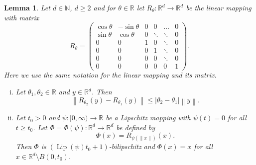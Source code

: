 \documentclass[a4paper, bibliography=totoc]{scrartcl}
\newtheorem{lemma}[define]{Lemma}
\numberwithin{claimcounter}{define}
\newcommand{\R}{\mathbb{R}}
\newcommand{\N}{\mathbb{N}}
\newcommand{\lip}{\operatorname{Lip}}
\newcommand{\abs}[1]{\left|#1\right|}
\newcommand{\enorm}[1]{\left\|#1\right\|}
\newcommand{\br}[1]{\left(#1\right)}
\begin{document}
\begin{lemma}\label{lemma:spin}
	Let $d\in\N$, $d\geq 2$ and for $\theta\in \R$ let $R_{\theta}\colon \R^{d}\to\R^{d}$ be the linear mapping with matrix
	\begin{equation*}
	R_{\theta}=\begin{pmatrix}
	\cos\theta & -\sin\theta & 0 & 0 &  \ldots & 0\\
	\sin\theta & \cos\theta & 0 & \ddots& \ddots & 0\\
	0 & 0 &1 & 0 &  \ddots &0\\
	0 & 0 & 0 & 1 & \ddots& 0\\
	0 & 0 & 0 & 0 & \ddots & 0\\
	0 & 0 & 0 & 0 & 0 & 1 
	\end{pmatrix}.
	\end{equation*}
	Here we use the same notation for the linear mapping and its matrix. 
	\begin{enumerate}[(i)]
		\item\label{different_rotations} Let $\theta_{1},\theta_{2}\in\R$ and $y\in\R^{d}$. Then
		\begin{equation*}
		\enorm{R_{\theta_{2}}(y)-R_{\theta_{1}}(y)}\leq \abs{\theta_{2}-\theta_{1}}\enorm{y}.
		\end{equation*}
		\item\label{spin_Lipschitz} Let $t_{0}>0$ and $\psi\colon [0,\infty)\to \R$ be a Lipschitz mapping with $\psi(t)=0$ for all $t\geq t_{0}$. Let $\Phi=\Phi(\psi)\colon\R^{d}\to\R^{d}$ be defined by 
		\begin{equation*}
		\Phi(x)=R_{\psi(\enorm{x})}(x).
		\end{equation*}
		Then $\Phi$ is $\br{\lip(\psi)t_{0}+1}$-bilipschitz and $\Phi(x)=x$ for all $x\in \R^{d}\setminus B(0,t_{0})$.
	\end{enumerate}
\end{lemma}
\end{document}
